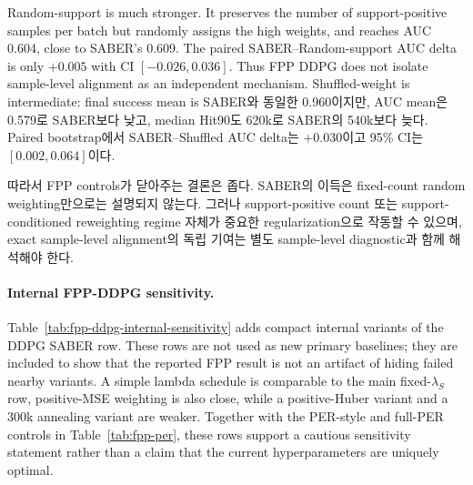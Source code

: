 \documentclass[letterpaper]{article}
\begin{document}
Random-support is much stronger. It preserves the number of support-positive samples per batch but randomly assigns the high weights, and reaches AUC 0.604, close to SABER's 0.609. The paired SABER--Random-support AUC delta is only \(+0.005\) with CI \([-0.026,0.036]\). Thus FPP DDPG does not isolate sample-level alignment as an independent mechanism. Shuffled-weight is intermediate: final success mean is SABER와 동일한 0.960이지만, AUC mean은 0.579로 SABER보다 낮고, median Hit90도 620k로 SABER의 540k보다 늦다. Paired bootstrap에서 SABER--Shuffled AUC delta는 \(+0.030\)이고 95\% CI는 \([0.002,0.064]\)이다.

따라서 FPP controls가 닫아주는 결론은 좁다. SABER의 이득은 fixed-count random weighting만으로는 설명되지 않는다. 그러나 support-positive count 또는 support-conditioned reweighting regime 자체가 중요한 regularization으로 작동할 수 있으며, exact sample-level alignment의 독립 기여는 별도 sample-level diagnostic과 함께 해석해야 한다.

\paragraph{Internal FPP-DDPG sensitivity.}
Table~\ref{tab:fpp-ddpg-internal-sensitivity} adds compact internal variants of the DDPG SABER row. These rows are not used as new primary baselines; they are included to show that the reported FPP result is not an artifact of hiding failed nearby variants. A simple lambda schedule is comparable to the main fixed-\(\lambda_S\) row, positive-MSE weighting is also close, while a positive-Huber variant and a 300k annealing variant are weaker. Together with the PER-style and full-PER controls in Table~\ref{tab:fpp-per}, these rows support a cautious sensitivity statement rather than a claim that the current hyperparameters are uniquely optimal.
\end{document}
